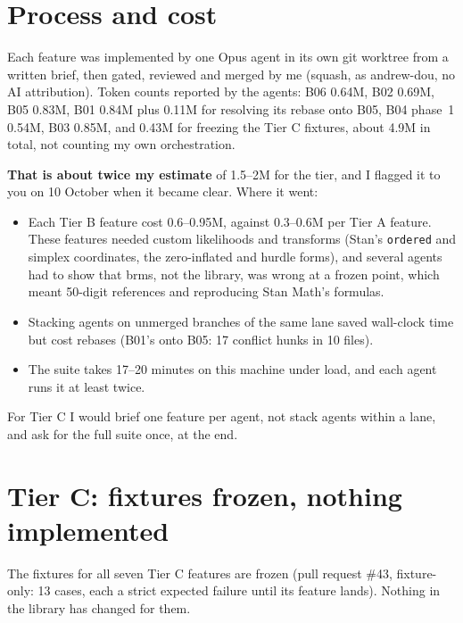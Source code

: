 \documentclass[11pt]{article}
\newcommand{\code}[1]{\texttt{#1}}
\begin{document}
\section{Process and cost}
\label{sec:cost}

Each feature was implemented by one Opus agent in its own git worktree from a written brief, then gated, reviewed and
merged by me (squash, as andrew-dou, no AI attribution). Token counts reported by the agents: B06 0.64M, B02 0.69M,
B05 0.83M, B01 0.84M plus 0.11M for resolving its rebase onto B05, B04 phase~1 0.54M, B03 0.85M, and 0.43M
for freezing the Tier C fixtures, about 4.9M in total, not counting my own orchestration.

\textbf{That is about twice my estimate} of 1.5--2M for the tier, and I flagged it to you on 10 October when it became
clear. Where it went:
\begin{itemize}
\item Each Tier B feature cost 0.6--0.95M, against 0.3--0.6M per Tier A feature. These features needed custom
  likelihoods and transforms (Stan's \code{ordered} and simplex coordinates, the zero-inflated and hurdle forms), and
  several agents had to show that brms, not the library, was wrong at a frozen point, which meant 50-digit references
  and reproducing Stan Math's formulas.
\item Stacking agents on unmerged branches of the same lane saved wall-clock time but cost rebases (B01's onto B05:
  17 conflict hunks in 10 files).
\item The suite takes 17--20 minutes on this machine under load, and each agent runs it at least twice.
\end{itemize}
\noindent For Tier C I would brief one feature per agent, not stack agents within a lane, and ask for the full suite
once, at the end.

\section{Tier C: fixtures frozen, nothing implemented}
\label{sec:tierc}

The fixtures for all seven Tier C features are frozen (pull request \#43, fixture-only: 13 cases, each a strict
expected failure until its feature lands). Nothing in the library has changed for them.
\end{document}
